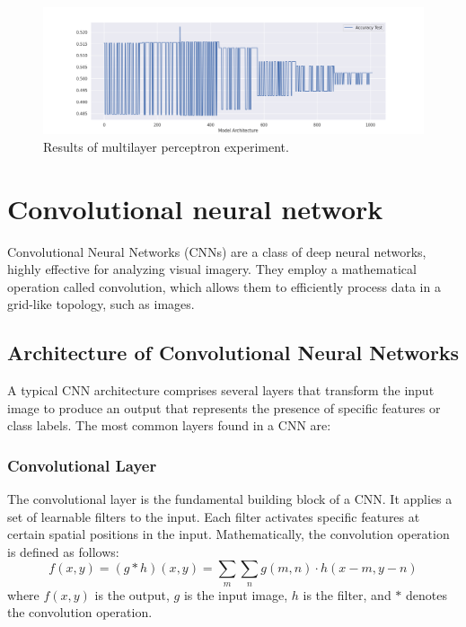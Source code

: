 \begin{figure}[h!]
	\includegraphics[width=\linewidth]{"pictures/mlp_res.png"}
	\caption{Results of multilayer perceptron experiment.}
	\label{fig:mlp}

\end{figure}


























\section{Convolutional neural network}
Convolutional Neural Networks (CNNs) are a class of deep neural networks, highly effective for analyzing visual imagery. They employ a mathematical operation called convolution, which allows them to efficiently process data in a grid-like topology, such as images.

\subsection{Architecture of Convolutional Neural Networks}
A typical CNN architecture comprises several layers that transform the input image to produce an output that represents the presence of specific features or class labels. The most common layers found in a CNN are:

\subsubsection{Convolutional Layer}
The convolutional layer is the fundamental building block of a CNN. It applies a set of learnable filters to the input. Each filter activates specific features at certain spatial positions in the input. Mathematically, the convolution operation is defined as follows:
\[f(x, y) = (g * h)(x, y) = \sum_m\sum_n g(m,n) \cdot h(x-m, y-n)\]
where \(f(x, y)\) is the output, \(g\) is the input image, \(h\) is the filter, and \(*\) denotes the convolution operation.

